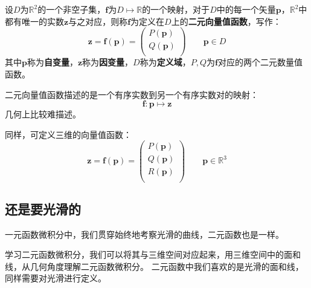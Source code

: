 \begin{definition}[二元向量值函数]
设$D$为$\mathbb{R} ^2$的一个非空子集，$\boldsymbol{f}$为$D\mapsto \mathbb{R} $的一个映射，对于$D$中的每一个矢量$\boldsymbol{p}$，$\mathbb{R} ^2$中都有唯一的实数$\boldsymbol{z}$与之对应，则称$\boldsymbol{f}$为定义在$D$上的{\bf 二元向量值函数}，写作：
\[
\boldsymbol{z}=\boldsymbol{f}\left( \boldsymbol{p} \right) =\left( \begin{array}{c}
	P\left( \boldsymbol{p} \right)\\
	Q\left( \boldsymbol{p} \right)\\
\end{array} \right) \qquad \boldsymbol{p}\in D
\]
其中$\boldsymbol{p}$称为{\bf 自变量}，$\boldsymbol{z}$称为{\bf 因变量}，$D$称为{\bf 定义域}，$P,Q$为$\boldsymbol{f}$对应的两个二元数量值函数。
\end{definition}

二元向量值函数描述的是一个有序实数到另一个有序实数对的映射：
\[
\boldsymbol{f}:\boldsymbol{p}\mapsto \boldsymbol{z}
\]
几何上比较难描述。

同样，可定义三维的向量值函数：
\[
\boldsymbol{z}=\boldsymbol{f}\left( \boldsymbol{p} \right) =\left( \begin{array}{c}
	P\left( \boldsymbol{p} \right)\\
	Q\left( \boldsymbol{p} \right)\\
	R\left( \boldsymbol{p} \right)\\
\end{array} \right) \qquad \boldsymbol{p}\in \mathbb{R} ^3
\]

\subsection{还是要光滑的}

一元函数微积分中，我们贯穿始终地考察光滑的曲线，二元函数也是一样。

学习二元函数微积分，我们可以将其与三维空间对应起来，用三维空间中的面和线，从几何角度理解二元函数微积分。
二元函数中我们喜欢的是光滑的面和线，同样需要对光滑进行定义。




